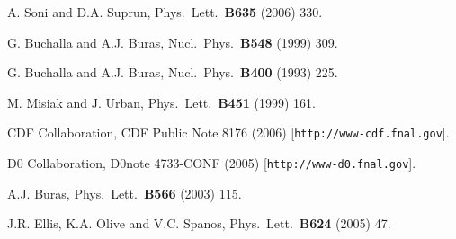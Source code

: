\documentclass[11pt]{cernrep}
\begin{document}
\begin{thebibliography}{999}
A. Soni and D.A. Suprun,
  Phys.\ Lett.\  {\bf B635} (2006) 330.

G. Buchalla and A.J. Buras,
{ Nucl.\ Phys.}~{\bf B548} (1999) 309.

G. Buchalla and A.J. Buras,
{ Nucl.\ Phys.}~{\bf B400} (1993) 225.

M. Misiak and J. Urban,
{ Phys.\ Lett.}~{\bf B451} (1999) 161.

CDF Collaboration, CDF Public Note 8176 (2006)
[{\tt http://www-cdf.fnal.gov}].

D0 Collaboration, D0note 4733-CONF (2005) 
[{\tt http://www-d0.fnal.gov}].

A.J. Buras,
{ Phys.\ Lett.}~{\bf B566} (2003) 115.

J.R. Ellis, K.A. Olive and V.C. Spanos,
 { Phys.\ Lett.}~{\bf B624} (2005) 47.

\end{thebibliography}
\end{document}

